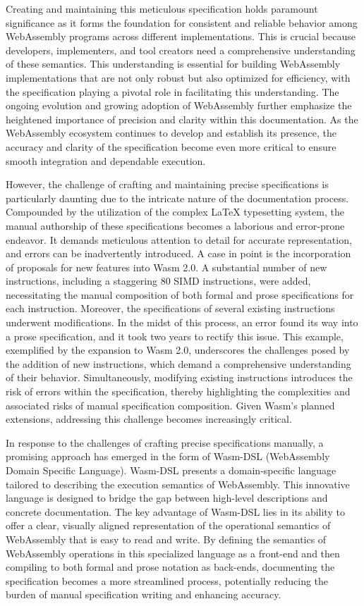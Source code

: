 Creating and maintaining this meticulous specification holds paramount
significance as it forms the foundation for consistent and reliable behavior
among WebAssembly programs across different implementations. This is crucial
because developers, implementers, and tool creators need a comprehensive
understanding of these semantics. This understanding is essential for building
WebAssembly implementations that are not only robust but also optimized for
efficiency, with the specification playing a pivotal role in facilitating this
understanding. The ongoing evolution and growing adoption of WebAssembly
further emphasize the heightened importance of precision and clarity within
this documentation. As the WebAssembly ecosystem continues to develop and
establish its presence, the accuracy and clarity of the specification become
even more critical to ensure smooth integration and dependable execution.

However, the challenge of crafting and maintaining precise specifications is
particularly daunting due to the intricate nature of the documentation process.
Compounded by the utilization of the complex LaTeX typesetting system, the
manual authorship of these specifications becomes a laborious and error-prone
endeavor. It demands meticulous attention to detail for accurate
representation, and errors can be inadvertently introduced. A case in point is
the incorporation of proposals for new features into Wasm 2.0. A substantial
number of new instructions, including a staggering 80 SIMD instructions, were
added, necessitating the manual composition of both formal and prose
specifications for each instruction. Moreover, the specifications of several
existing instructions underwent modifications. In the midst of this process, an
error found its way into a prose specification, and it took two years to
rectify this issue. This example, exemplified by the expansion to Wasm 2.0,
underscores the challenges posed by the addition of new instructions, which
demand a comprehensive understanding of their behavior. Simultaneously,
modifying existing instructions introduces the risk of errors within the
specification, thereby highlighting the complexities and associated risks of
manual specification composition. Given Wasm's planned extensions, addressing
this challenge becomes increasingly critical.

In response to the challenges of crafting precise specifications manually, a
promising approach has emerged in the form of Wasm-DSL (WebAssembly Domain
Specific Language). Wasm-DSL presents a domain-specific language tailored to
describing the execution semantics of WebAssembly. This innovative language is
designed to bridge the gap between high-level descriptions and concrete
documentation. The key advantage of Wasm-DSL lies in its ability to offer a
clear, visually aligned representation of the operational semantics of
WebAssembly that is easy to read and write. By defining the semantics of
WebAssembly operations in this specialized language as a front-end and then
compiling to both formal and prose notation as back-ends, documenting the
specification becomes a more streamlined process, potentially reducing the
burden of manual specification writing and enhancing accuracy.

